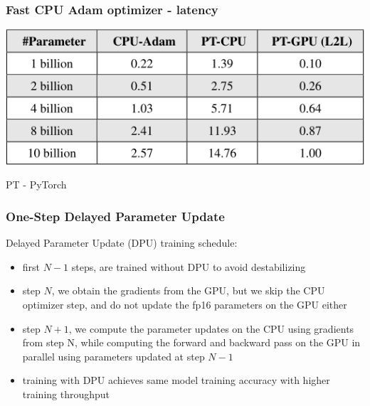 \documentclass{beamer}
\begin{document}
\begin{frame}
    \frametitle{Fast CPU Adam optimizer - latency}
    \begin{center}
        \includegraphics[scale=2.0]{img/adam_latency.png}

        \tiny{PT - PyTorch}
    \end{center}
\end{frame}

\begin{frame}
    \frametitle{One-Step Delayed Parameter Update}
    Delayed Parameter Update (DPU) training schedule:
    \begin{itemize}
        \item first $N - 1$ steps, are trained without DPU to avoid
destabilizing
        \item step $N$, we obtain the gradients from the GPU, but we skip the CPU optimizer step, and do not update the fp16 parameters on the GPU either
        \item step $N + 1$, we compute the parameter updates on the CPU using gradients from step N, while computing the forward and backward pass on the GPU in parallel using parameters updated at step $N - 1$
        \item training with DPU achieves same model training accuracy with higher training throughput
    \end{itemize}
\end{frame}
\end{document}
